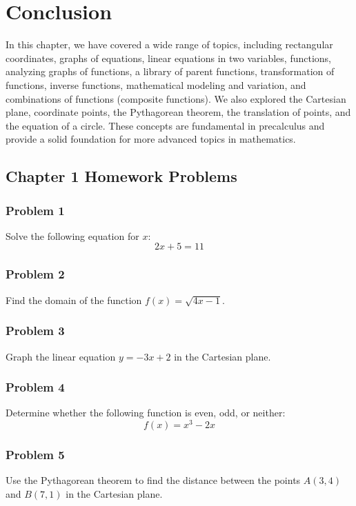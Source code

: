 \documentclass{article}
\begin{document}
\section{Conclusion}


In this chapter, we have covered a wide range of topics, including rectangular coordinates, graphs of equations, linear equations in two variables, functions, analyzing graphs of functions, a library of parent functions, transformation of functions, inverse functions, mathematical modeling and variation, and combinations of functions (composite functions). We also explored the Cartesian plane, coordinate points, the Pythagorean theorem, the translation of points, and the equation of a circle. These concepts are fundamental in precalculus and provide a solid foundation for more advanced topics in mathematics.

\newpage %

\subsection{Chapter 1 Homework Problems}

\subsubsection{Problem 1}

Solve the following equation for $x$:
\[2x + 5 = 11\]

\subsubsection{Problem 2}

Find the domain of the function $f(x) = \sqrt{4x - 1}$.

\subsubsection{Problem 3}

Graph the linear equation $y = -3x + 2$ in the Cartesian plane.

\subsubsection{Problem 4}

Determine whether the following function is even, odd, or neither:
\[f(x) = x^3 - 2x\]

\subsubsection{Problem 5}

Use the Pythagorean theorem to find the distance between the points $A(3, 4)$ and $B(7, 1)$ in the Cartesian plane.
\end{document}

